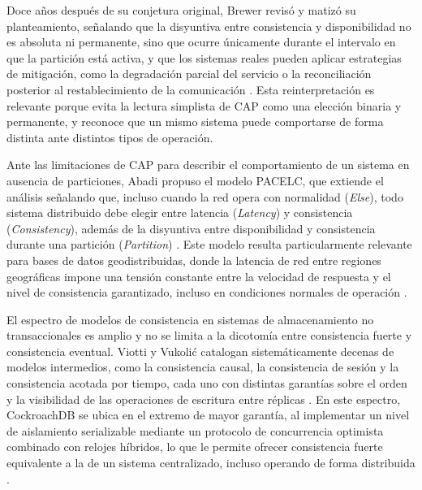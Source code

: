 \documentclass[12pt, a4paper]{article}
\begin{document}
Doce años después de su conjetura original, Brewer revisó y matizó su planteamiento, señalando que la disyuntiva entre consistencia y disponibilidad no es absoluta ni permanente, sino que ocurre únicamente durante el intervalo en que la partición está activa, y que los sistemas reales pueden aplicar estrategias de mitigación, como la degradación parcial del servicio o la reconciliación posterior al restablecimiento de la comunicación \cite{brewer2012cap}. Esta reinterpretación es relevante porque evita la lectura simplista de CAP como una elección binaria y permanente, y reconoce que un mismo sistema puede comportarse de forma distinta ante distintos tipos de operación.

Ante las limitaciones de CAP para describir el comportamiento de un sistema en ausencia de particiones, Abadi propuso el modelo PACELC, que extiende el análisis señalando que, incluso cuando la red opera con normalidad (\textit{Else}), todo sistema distribuido debe elegir entre latencia (\textit{Latency}) y consistencia (\textit{Consistency}), además de la disyuntiva entre disponibilidad y consistencia durante una partición (\textit{Partition}) \cite{abadi2012consistency}. Este modelo resulta particularmente relevante para bases de datos geodistribuidas, donde la latencia de red entre regiones geográficas impone una tensión constante entre la velocidad de respuesta y el nivel de consistencia garantizado, incluso en condiciones normales de operación \cite{abadi2012consistency}.

El espectro de modelos de consistencia en sistemas de almacenamiento no transaccionales es amplio y no se limita a la dicotomía entre consistencia fuerte y consistencia eventual. Viotti y Vukolić catalogan sistemáticamente decenas de modelos intermedios, como la consistencia causal, la consistencia de sesión y la consistencia acotada por tiempo, cada uno con distintas garantías sobre el orden y la visibilidad de las operaciones de escritura entre réplicas \cite{viotti2016consistency}. En este espectro, CockroachDB se ubica en el extremo de mayor garantía, al implementar un nivel de aislamiento serializable mediante un protocolo de concurrencia optimista combinado con relojes híbridos, lo que le permite ofrecer consistencia fuerte equivalente a la de un sistema centralizado, incluso operando de forma distribuida \cite{taft2020cockroachdb}.
\end{document}
